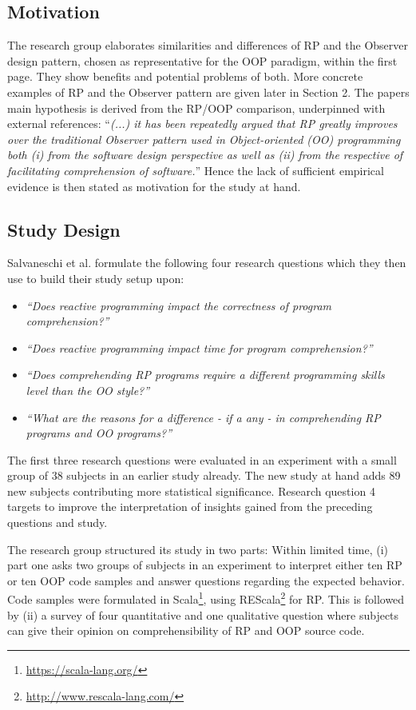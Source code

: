 \documentclass[12pt,a4paper]{article}
\begin{document}
\subsection{Motivation}
The research group elaborates similarities and differences of RP and the Observer design pattern, chosen as representative for the OOP paradigm, within the first page. They show benefits and potential problems of both. More concrete examples of RP and the Observer pattern are given later in Section 2. The papers main hypothesis is derived from the RP/OOP comparison, underpinned with external references: ``\emph{(...) it has been repeatedly argued that RP greatly improves over the traditional Observer pattern used in Object-oriented (OO) programming both (i) from the software design perspective as well as (ii) from the respective of facilitating comprehension of software.}'' Hence the lack of sufficient empirical evidence is then stated as motivation for the study at hand.

\subsection{Study Design}
Salvaneschi et al. formulate the following four research questions which they then use to build their study setup upon:

\begin{itemize}
	\item \emph{``Does reactive programming impact the correctness of program comprehension?''}
	\item \emph{``Does reactive programming impact time for program comprehension?''}
	\item \emph{``Does comprehending RP programs require a different programming skills level than the OO style?''}
	\item \emph{``What are the reasons for a difference - if a any - in comprehending RP programs and OO programs?''}
\end{itemize}

The first three research questions were evaluated in an experiment with a small group of 38 subjects in an earlier study \cite{Salvaneschi:2014:ESP:2635868.2635895} already. The new study at hand adds 89 new subjects contributing more statistical significance. Research question 4 targets to improve the interpretation of insights gained from the preceding questions and study.

The research group structured its study in two parts: Within limited time, (i) part one asks two groups of subjects in an experiment to interpret either ten RP or ten OOP code samples and answer questions regarding the expected behavior. Code samples were formulated in Scala\footnote{\url{https://scala-lang.org/}}, using REScala\footnote{\url{http://www.rescala-lang.com/}} for RP. This is followed by (ii) a survey of four quantitative and one qualitative question where subjects can give their opinion on comprehensibility of RP and OOP source code.
\end{document}

